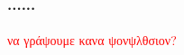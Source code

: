 \documentclass{beamer}
\begin{document}
\begin{frame}\frametitle{......}\framesubtitle{}
\textcolor{red}{να γράψουμε κανα ψονψλθσιον?}
\end{frame}


% 
% 
\end{document}
